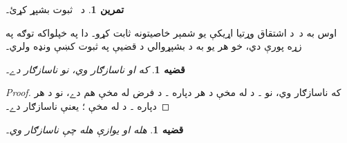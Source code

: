 \documentclass[12pt,a4paper,oneside]{report}
\newcommand{\olfileid}[3]{\gdef\pspart{#1}\gdef\pschapter{#2}\gdef\pssection{#3}}
\gdef\pspart{#2}\gdef\pschapter{#3}\gdef\pssection{}%
\newcommand{\ollabel}[1]{\label{\pspart:\pschapter:\pssection:#1}}
\newtheorem{prop}[thm]{قضيه}
\theoremstyle{definition}
\newtheorem{prob}[thm]{تمرين}
\begin{document}
\label{olpseg:OLP-0120-B011:start}
\begin{prob}
  د~ ثبوت بشپړ کړئ۔
\end{prob}
\label{olpseg:OLP-0120-B011:end}

\label{olpseg:OLP-0121-B004:start}
\olfileid{fol}{axd}{prv}
\label{olpseg:OLP-0121-B004:end}

\label{olpseg:OLP-0121-B005:start}
\label{olpseg:OLP-0121-B005:end}

\label{olpseg:OLP-0121-B006:start}
اوس به د~د اشتقاق وړتيا اړيکې يو شمېر خاصيتونه ثابت کړو۔ دا په
خپلواکه توګه په زړه پورې دي، خو هر يو به د بشپړوالي د قضیې په
ثبوت کښې ونډه ولري۔
\label{olpseg:OLP-0121-B006:end}

\label{olpseg:OLP-0121-B007:start}
\begin{prop}\ollabel{prop:provability-contr}
  که  او  ناسازګار وي، نو
  \LR{$\Gamma$} ناسازګار دے۔
\end{prop}
\label{olpseg:OLP-0121-B007:end}

\label{olpseg:OLP-0121-B008:start}
\begin{proof}
  که  ناسازګار وي، نو
  ۔ د
   له مخې د هر  دپاره
  ۔ د فرض له مخې  هم دے،
  نو د هر  دپاره
  ۔ د  له مخې
  \LR{$\Gamma \Proves \lfalse$}؛ يعنې \LR{$\Gamma$} ناسازګار دے۔
\end{proof}
\label{olpseg:OLP-0121-B008:end}

\label{olpseg:OLP-0121-B009:start}
\begin{prop}
\ollabel{prop:prov-incons}
 هله او يوازې هله چې
 ناسازګار وي۔
\end{prop}
\label{olpseg:OLP-0121-B009:end}
\end{document}
